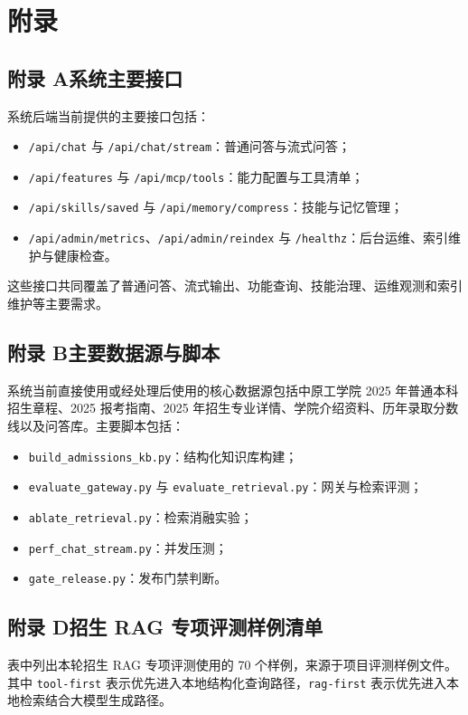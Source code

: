 \documentclass[UTF8,zihao=-4,oneside]{ctexbook}
\numberwithin{equation}{chapter}
\begin{document}
\clearpage
\chapter*{附录}

\section*{附录 A\quad 系统主要接口}
{}
系统后端当前提供的主要接口包括：
\begin{itemize}
  \item \texttt{/api/chat} 与 \texttt{/api/chat/stream}：普通问答与流式问答；
  \item \texttt{/api/features} 与 \texttt{/api/mcp/tools}：能力配置与工具清单；
  \item \texttt{/api/skills/saved} 与 \texttt{/api/memory/compress}：技能与记忆管理；
  \item \texttt{/api/admin/metrics}、\texttt{/api/admin/reindex} 与 \texttt{/healthz}：后台运维、索引维护与健康检查。
\end{itemize}
这些接口共同覆盖了普通问答、流式输出、功能查询、技能治理、运维观测和索引维护等主要需求。

\section*{附录 B\quad 主要数据源与脚本}
{}
系统当前直接使用或经处理后使用的核心数据源包括中原工学院 2025 年普通本科招生章程、2025 报考指南、2025 年招生专业详情、学院介绍资料、历年录取分数线以及问答库。主要脚本包括：
\begin{itemize}
  \item \texttt{build\_admissions\_kb.py}：结构化知识库构建；
  \item \texttt{evaluate\_gateway.py} 与 \texttt{evaluate\_retrieval.py}：网关与检索评测；
  \item \texttt{ablate\_retrieval.py}：检索消融实验；
  \item \texttt{perf\_chat\_stream.py}：并发压测；
  \item \texttt{gate\_release.py}：发布门禁判断。
\end{itemize}

\section*{附录 D\quad 招生 RAG 专项评测样例清单}
{}
表中列出本轮招生 RAG 专项评测使用的 70 个样例，来源于项目评测样例文件。其中 \texttt{tool-first} 表示优先进入本地结构化查询路径，\texttt{rag-first} 表示优先进入本地检索结合大模型生成路径。
\end{document}
